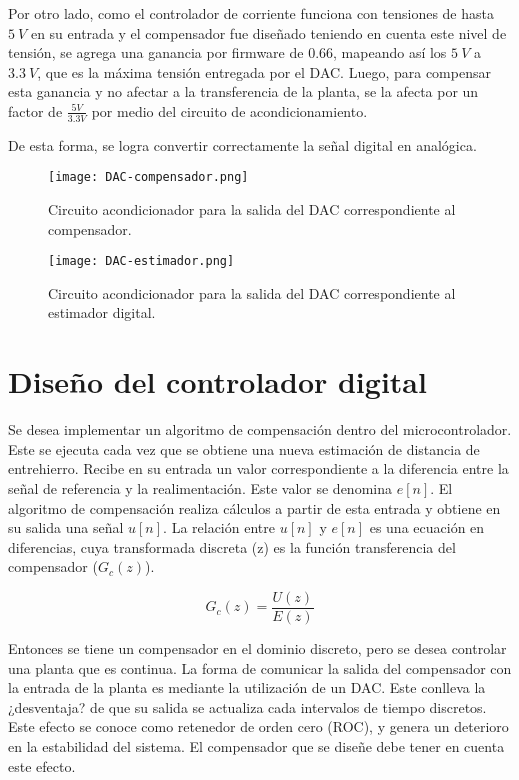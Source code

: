  Por otro lado, como el controlador de corriente funciona con tensiones de hasta $5\:V$ en su entrada y el compensador fue diseñado teniendo en cuenta este nivel de tensión, se agrega una ganancia por firmware de $0.66$, mapeando así los $5\:V$ a $3.3\:V$, que es la máxima tensión entregada por el DAC. Luego, para compensar esta ganancia y no afectar a la transferencia de la planta, se la afecta por un factor de $\frac{5V}{3.3V}$ por medio del circuito de acondicionamiento.

 De esta forma, se logra convertir correctamente la señal digital en analógica.


\begin{figure}[H]
	\centering
	\texttt{[image: DAC-compensador.png]}
	\caption{Circuito acondicionador para la salida del DAC correspondiente al compensador.}
	\label{fig:DAC-compensador}
\end{figure}

\begin{figure}[H]
	\centering
	\texttt{[image: DAC-estimador.png]}
	\caption{Circuito acondicionador para la salida del DAC correspondiente al estimador digital.}
	\label{fig:DAC-estimador}
\end{figure}

\section{Diseño del controlador digital}

Se desea implementar un algoritmo de compensación dentro del microcontrolador. Este se ejecuta cada vez que se obtiene una nueva estimación de distancia de entrehierro. Recibe en su entrada un valor correspondiente a la diferencia entre la señal de referencia y la realimentación. Este valor se denomina $e[n]$. El algoritmo de compensación realiza cálculos a partir de esta entrada y obtiene en su salida una señal $u[n]$. La relación entre $u[n]$ y $e[n]$ es una ecuación en diferencias, cuya transformada discreta (z) es la función transferencia del compensador ($G_c(z)$).

\begin{equation*}
	G_c(z)=\frac{U(z)}{E(z)}
\end{equation*}

Entonces se tiene un compensador en el dominio discreto, pero se desea controlar una planta que es continua. La forma de comunicar la salida del compensador con la entrada de la planta es mediante la utilización de un DAC. Este conlleva la ¿desventaja? de que su salida se actualiza cada intervalos de tiempo discretos. Este efecto se conoce como retenedor de orden cero (ROC), y genera un deterioro en la estabilidad del sistema. El compensador que se diseñe debe tener en cuenta este efecto.



